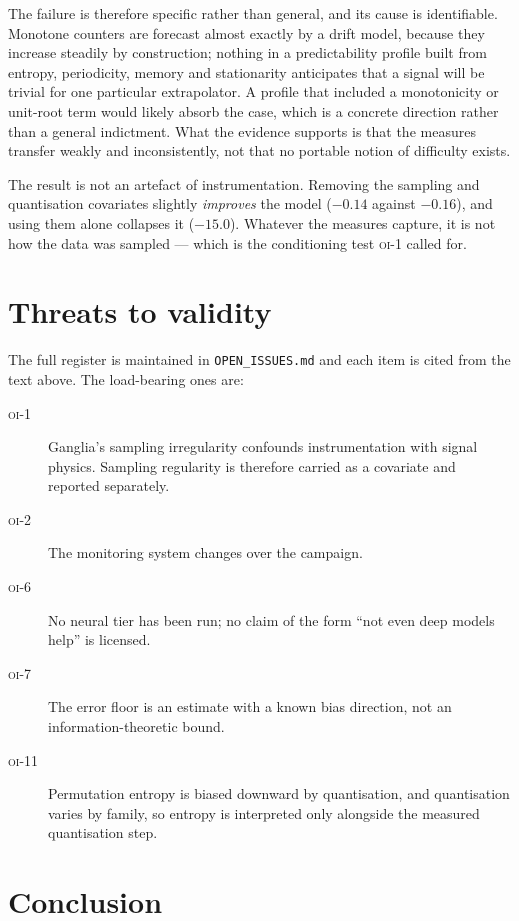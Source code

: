 \documentclass[11pt,a4paper]{article}
\newcommand{\oi}[1]{\textsc{oi-#1}}
\begin{document}
The failure is therefore specific rather than general, and its cause is
identifiable. Monotone counters are forecast almost exactly by a drift model,
because they increase steadily by construction; nothing in a predictability
profile built from entropy, periodicity, memory and stationarity anticipates
that a signal will be trivial for one particular extrapolator. A profile that
included a monotonicity or unit-root term would likely absorb the case, which is
a concrete direction rather than a general indictment. What the evidence
supports is that the measures transfer weakly and inconsistently, not that no
portable notion of difficulty exists.

The result is not an artefact of instrumentation. Removing the sampling and
quantisation covariates slightly \emph{improves} the model (\(-0.14\) against
\(-0.16\)), and using them alone collapses it (\(-15.0\)). Whatever the
measures capture, it is not how the data was sampled --- which is the
conditioning test \oi{1} called for.

\section{Threats to validity}
\label{sec:threats}

The full register is maintained in \texttt{OPEN\_ISSUES.md} and each item is
cited from the text above. The load-bearing ones are:

\begin{description}
  \item[\oi{1}] Ganglia's sampling irregularity confounds instrumentation with
        signal physics. Sampling regularity is therefore carried as a covariate
        and reported separately.
  \item[\oi{2}] The monitoring system changes over the campaign.
  \item[\oi{6}] No neural tier has been run; no claim of the form ``not even
        deep models help'' is licensed.
  \item[\oi{7}] The error floor is an estimate with a known bias direction, not
        an information-theoretic bound.
  \item[\oi{11}] Permutation entropy is biased downward by quantisation, and
        quantisation varies by family, so entropy is interpreted only alongside
        the measured quantisation step.
\end{description}

\section{Conclusion}
\end{document}
